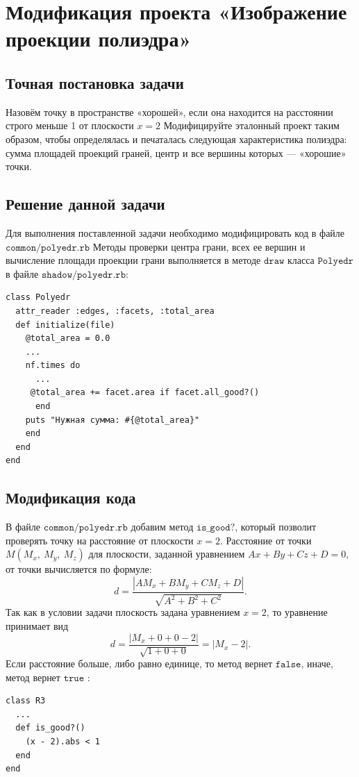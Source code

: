 \section{Модификация проекта «Изображение проекции полиэдра»}

\subsection*{Точная постановка задачи}
Назовём точку в пространстве «хорошей», если она находится на расстоянии строго меньше 1 от плоскости $\mathit x =2$ Модифицируйте эталонный проект таким образом, чтобы определялась и печаталась следующая характеристика полиэдра: сумма площадей проекций граней, центр и все вершины которых — «хорошие» точки.


\subsection*{Решение данной задачи}
Для выполнения поставленной задачи необходимо модифицировать код в файле $\texttt{common/polyedr.rb}$ 
Методы проверки центра грани, всех ее вершин и вычисление площади проекции грани выполняется в методе $\texttt{draw}$ класса $\texttt{Polyedr}$ в файле $\texttt{shadow/polyedr.rb}$:


\begin{small}
\begin{verbatim}
class Polyedr 
  attr_reader :edges, :facets, :total_area
  def initialize(file)
    @total_area = 0.0
    ...
    nf.times do
      ...
     @total_area += facet.area if facet.all_good?() 
      end
    puts "Нужная сумма: #{@total_area}"
    end
  end
end
\end{verbatim}
\end{small}

 \subsection*{Модификация кода}

В файле $\texttt{common/polyedr.rb}$ добавим метод $\texttt{is\_good?}$, который позволит проверять точку на расстояние от плоскости $\mathit x=2$. Расстояние от точки $\mathit{M(M_{x},~M_{y},~M_{z})}$ для плоскости, заданной уравнением $\mathit{Ax+By+Cz+D=0},$ от точки вычисляется по формуле: 
$$ \mathit{d=\frac{|AM_{x}+BM_{y}+CM_{z}+D|}{\sqrt{A^2+B^2+C^2}}}.$$
Так как в условии задачи плоскость задана уравнением $\mathit x=2$, то уравнение принимает вид
$$ \mathit{d=\frac{|M_{x}+0+0-2|}{\sqrt{1+0+0}}=|M_{x}-2|}.$$
Если расстояние больше, либо равно единице, то метод вернет $\texttt{false}$, иначе, метод вернет $\texttt{true}$ :
\begin{small}
\begin{verbatim}
class R3 
  ...
  def is_good?()
    (x - 2).abs < 1
  end
end
\end{verbatim}
\end{small}

